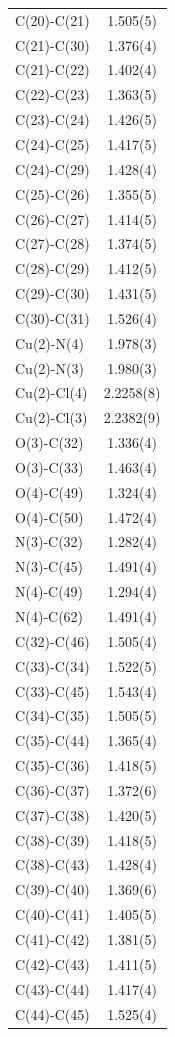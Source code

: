 \begin{center}
{\begin{supertabular}{p{1.5in}c}
C(20)-C(21) &1.505(5)\\
C(21)-C(30) &1.376(4)\\
C(21)-C(22) &1.402(4)\\
C(22)-C(23) &1.363(5)\\
C(23)-C(24) &1.426(5)\\
C(24)-C(25) &1.417(5)\\
C(24)-C(29) &1.428(4)\\
C(25)-C(26) &1.355(5)\\
C(26)-C(27) &1.414(5)\\
C(27)-C(28) &1.374(5)\\
C(28)-C(29) &1.412(5)\\
C(29)-C(30) &1.431(5)\\
C(30)-C(31) &1.526(4)\\
Cu(2)-N(4) &1.978(3)\\
Cu(2)-N(3) &1.980(3)\\
Cu(2)-Cl(4) &2.2258(8)\\
Cu(2)-Cl(3) &2.2382(9)\\
O(3)-C(32) &1.336(4)\\
O(3)-C(33) &1.463(4)\\
O(4)-C(49) &1.324(4)\\
O(4)-C(50) &1.472(4)\\
N(3)-C(32) &1.282(4)\\
N(3)-C(45) &1.491(4)\\
N(4)-C(49) &1.294(4)\\
N(4)-C(62) &1.491(4)\\
C(32)-C(46) &1.505(4)\\
C(33)-C(34) &1.522(5)\\
C(33)-C(45) &1.543(4)\\
C(34)-C(35) &1.505(5)\\
C(35)-C(44) &1.365(4)\\
C(35)-C(36) &1.418(5)\\
C(36)-C(37) &1.372(6)\\
C(37)-C(38) &1.420(5)\\
C(38)-C(39) &1.418(5)\\
C(38)-C(43) &1.428(4)\\
C(39)-C(40) &1.369(6)\\
C(40)-C(41) &1.405(5)\\
C(41)-C(42) &1.381(5)\\
C(42)-C(43) &1.411(5)\\
C(43)-C(44) &1.417(4)\\
C(44)-C(45) &1.525(4)\\

\end{supertabular}}
\end{center}

